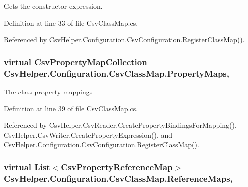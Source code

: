 Gets the constructor expression. 



Definition at line 33 of file Csv\-Class\-Map.\-cs.



Referenced by Csv\-Helper.\-Configuration.\-Csv\-Configuration.\-Register\-Class\-Map().

\hypertarget{a00060_a9580e897abcba144f3101eb983348e25}{
\subsubsection[{Property\-Maps}]{\setlength{\rightskip}{0pt plus 5cm}virtual {\bf Csv\-Property\-Map\-Collection} Csv\-Helper.\-Configuration.\-Csv\-Class\-Map.\-Property\-Maps\hspace{0.3cm}{\ttfamily [get]}, {\ttfamily [inherited]}}}\label{a00060_a9580e897abcba144f3101eb983348e25}


The class property mappings. 



Definition at line 39 of file Csv\-Class\-Map.\-cs.



Referenced by Csv\-Helper.\-Csv\-Reader.\-Create\-Property\-Bindings\-For\-Mapping(), Csv\-Helper.\-Csv\-Writer.\-Create\-Property\-Expression(), and Csv\-Helper.\-Configuration.\-Csv\-Configuration.\-Register\-Class\-Map().

\hypertarget{a00060_a6dfbf8f743b16d2ec83edef865ea2d9e}{
\subsubsection[{Reference\-Maps}]{\setlength{\rightskip}{0pt plus 5cm}virtual List$<${\bf Csv\-Property\-Reference\-Map}$>$ Csv\-Helper.\-Configuration.\-Csv\-Class\-Map.\-Reference\-Maps\hspace{0.3cm}{\ttfamily [get]}, {\ttfamily [inherited]}}}\label{a00060_a6dfbf8f743b16d2ec83edef865ea2d9e}


